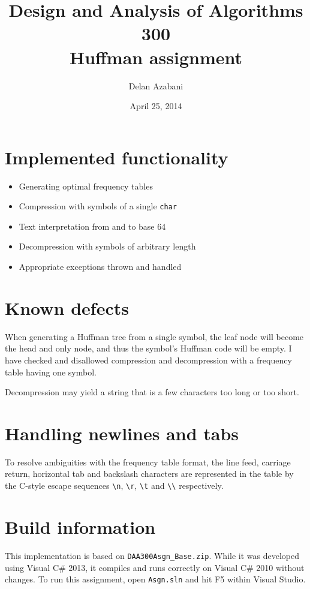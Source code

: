 \documentclass[a4paper,12pt]{article}
\title{Design and Analysis of Algorithms 300\\Huffman assignment}
\date{April 25, 2014}
\author{Delan Azabani}
\begin{document}
\maketitle

\section{Implemented functionality}

\begin{itemize}
	\item Generating optimal frequency tables
	\item Compression with symbols of a single \texttt{char}
	\item Text interpretation from and to base 64
	\item Decompression with symbols of arbitrary length
	\item Appropriate exceptions thrown and handled
\end{itemize}

\section{Known defects}

When generating a Huffman tree from a single symbol, the leaf node will become
the head and only node, and thus the symbol's Huffman code will be empty. I
have checked and disallowed compression and decompression with a frequency
table having one symbol.

Decompression may yield a string that is a few characters too long or too
short.

\section{Handling newlines and tabs}

To resolve ambiguities with the frequency table format, the line feed, carriage
return, horizontal tab and backslash characters are represented in the table by
the C-style escape sequences
\texttt{\textbackslash n},
\texttt{\textbackslash r},
\texttt{\textbackslash t} and
\texttt{\textbackslash\textbackslash} respectively.

\section{Build information}

This implementation is based on \texttt{DAA300Asgn\_Base.zip}. While it was
developed using Visual C\# 2013, it compiles and runs correctly on Visual C\#
2010 without changes. To run this assignment, open \texttt{Asgn.sln} and hit F5
within Visual Studio.
\end{document}
